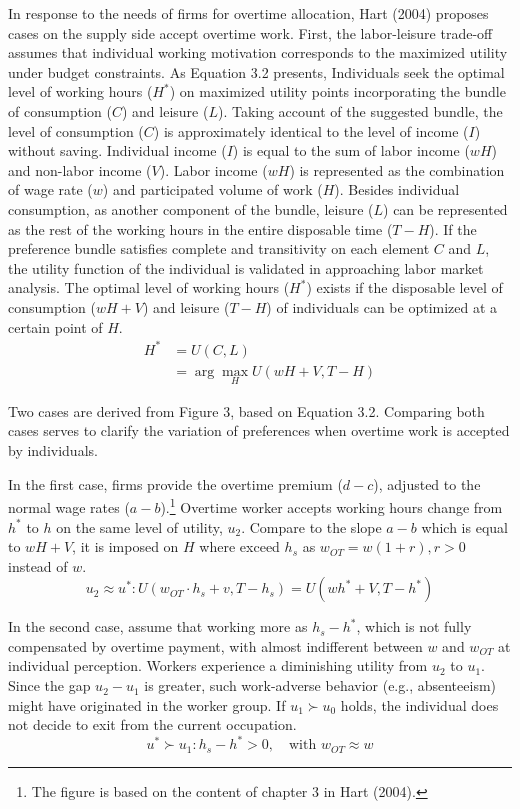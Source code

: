 \documentclass[
  12pt,
]{article}
\begin{document}
In response to the needs of firms for overtime allocation, Hart (2004)
proposes cases on the supply side accept overtime work. First, the
labor-leisure trade-off assumes that individual working motivation
corresponds to the maximized utility under budget constraints. As
Equation 3.2 presents, Individuals seek the optimal level of working
hours (\(H^*\)) on maximized utility points incorporating the bundle of
consumption (\(C\)) and leisure (\(L\)). Taking account of the suggested
bundle, the level of consumption (\(C\)) is approximately identical to
the level of income (\(I\)) without saving. Individual income (\(I\)) is
equal to the sum of labor income (\(wH\)) and non-labor income (\(V\)).
Labor income (\(wH\)) is represented as the combination of wage rate
(\(w\)) and participated volume of work (\(H\)). Besides individual
consumption, as another component of the bundle, leisure (\(L\)) can be
represented as the rest of the working hours in the entire disposable
time (\(T-H\)). If the preference bundle satisfies complete and
transitivity on each element \(C\) and \(L\), the utility function of
the individual is validated in approaching labor market analysis. The
optimal level of working hours (\(H^*\)) exists if the disposable level
of consumption (\(wH+V\)) and leisure (\(T-H\)) of individuals can be
optimized at a certain point of \(H\). \[
\begin{aligned}
H^*
&= U(C,L) \\
&= \arg\max_H U(wH+V,T-H)
\end{aligned}
\tag{3.2}
\]

Two cases are derived from Figure 3, based on Equation 3.2. Comparing
both cases serves to clarify the variation of preferences when overtime
work is accepted by individuals.

In the first case, firms provide the overtime premium (\(d-c\)),
adjusted to the normal wage rates (\(a-b\)).\footnote{The figure is
  based on the content of chapter 3 in Hart (2004).} Overtime worker
accepts working hours change from \(h^*\) to \(h\) on the same level of
utility, \(u_2\). Compare to the slope \(a-b\) which is equal to
\(wH+V\), it is imposed on \(H\) where exceed \(h_s\) as
\(w_{OT} = w(1+r), r > 0\) instead of \(w\). \[
u_2 \approx u^* : U(w_{OT} \cdot h_s + v, T-h_s) = U(wh^*+V,T-h^*)
\tag{Case 1}
\]

In the second case, assume that working more as \(h_s - h^*\), which is
not fully compensated by overtime payment, with almost indifferent
between \(w\) and \(w_{OT}\) at individual perception. Workers
experience a diminishing utility from \(u_2\) to \(u_1\). Since the gap
\(u_2-u_1\) is greater, such work-adverse behavior (e.g., absenteeism)
might have originated in the worker group. If \(u_1 \succ u_0\) holds,
the individual does not decide to exit from the current occupation. \[
u^* \succ u_1 : h_s - h^* > 0,\quad \text{with } w_{OT} \approx w 
\tag{Case 2}
\]
\end{document}
